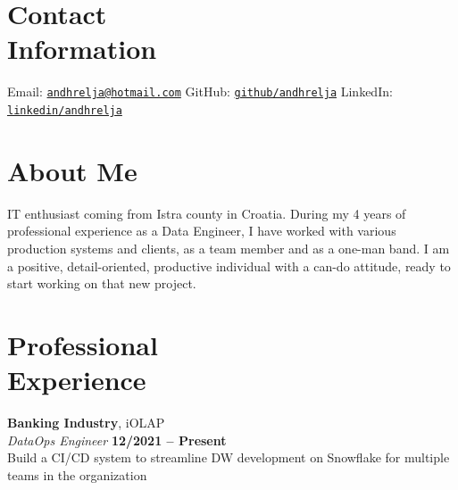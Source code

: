 \documentclass[margin,line]{resume}
\begin{document}
 
\begin{resume}

    \section{\mysidestyle Contact\\Information}

    Email: \href{mailto:andhrelja@hotmail.com}{\texttt{andhrelja@hotmail.com}} \hfill
    GitHub: \href{https://github.com/andhrelja}{\texttt{github/andhrelja}} \hfill
    LinkedIn: \href{https://www.linkedin.com/in/andhrelja/}{\texttt{linkedin/andhrelja}} \hfill

    \vspace{3mm}

    \section{\mysidestyle About Me}

    IT enthusiast coming from Istra county in Croatia. During my 4 years of professional experience as a Data Engineer, I have worked with various production systems and clients, as a team member and as a one-man band. I am a positive, detail-oriented, productive individual with a can-do attitude, ready to start working on that new project.

    \vspace{3mm}

    \section{\mysidestyle Professional\\Experience}

        \textbf{Banking Industry}, iOLAP \vspace{2mm}\\\vspace{1mm}%
    \textsl{DataOps Engineer} \hfill \textbf{12/2021 -- Present}\\
    Build a CI/CD system to streamline DW development on Snowflake for multiple teams in the organization


\end{resume}
\end{document}

